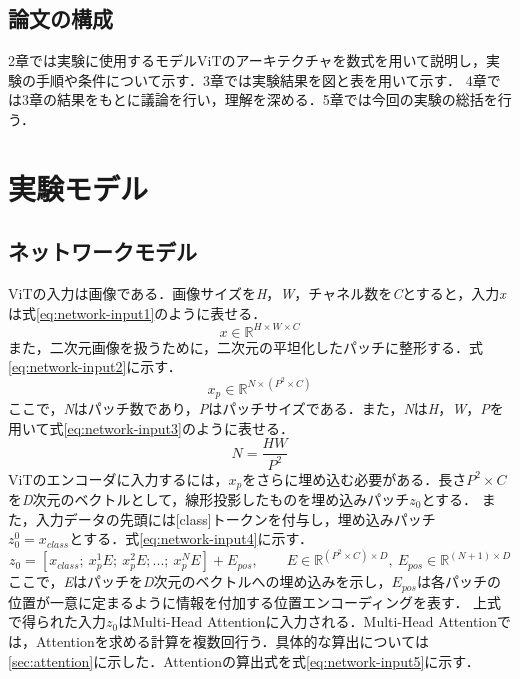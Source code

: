 \documentclass[a4paper, oneside, openany, dvipdfmx]{suribt}%
\newcommand{\eref}[1]{式\eqref{#1}}
\begin{document}
\section{論文の構成}
2章では実験に使用するモデルViTのアーキテクチャを数式を用いて説明し，実験の手順や条件について示す．3章では実験結果を図と表を用いて示す．
4章では3章の結果をもとに議論を行い，理解を深める．5章では今回の実験の総括を行う．

\chapter{実験モデル}

\section{ネットワークモデル}
ViTの入力は画像である．画像サイズを\textit{H}，\textit{W}，チャネル数を\textit{C}とすると，入力\textit{x}は\eref{eq:network-input1}のように表せる．
\begin{equation}
  x\in\mathbb{R}^{H\times W\times C}
  \label{eq:network-input1}
\end{equation}
また，二次元画像を扱うために，二次元の平坦化したパッチに整形する．\eref{eq:network-input2}に示す．
\begin{equation}
  x_{p}\in\mathbb{R}^{N\times(P^{2}\times C)}
  \label{eq:network-input2}
\end{equation}
ここで，\textit{N}はパッチ数であり，\textit{P}はパッチサイズである．また，\textit{N}は\textit{H}，\textit{W}，\textit{P}を用いて\eref{eq:network-input3}のように表せる．
\begin{equation}
  N=\frac{HW}{P^{2}}
  \label{eq:network-input3}
\end{equation}
ViTのエンコーダに入力するには，$x_{p}$をさらに埋め込む必要がある．長さ$P^{2}\times C$を\textit{D}次元のベクトルとして，線形投影したものを埋め込みパッチ$z_{0}$とする．
また，入力データの先頭には[class]トークンを付与し，埋め込みパッチ$z^{0}_{0}=x_{class}とする$．\eref{eq:network-input4}に示す．
\begin{equation}
  z_{0}=[x_{class};\ x^{1}_{p}E;\ x^{2}_{p}E;...;\ x^{N}_{p}E]+E_{pos},\qquad E\in\mathbb{R}^{(P^{2}\times C)\times D},\ E_{pos}\in\mathbb{R}^{(N+1)\times D}
  \label{eq:network-input4}
\end{equation}
ここで，\textit{E}はパッチを\textit{D}次元のベクトルへの埋め込みを示し，$E_{pos}$は各パッチの位置が一意に定まるように情報を付加する位置エンコーディングを表す．
上式で得られた入力$z_{0}$はMulti-Head Attentionに入力される．Multi-Head Attentionでは，Attentionを求める計算を複数回行う．具体的な算出については\ref{sec:attention}に示した．Attentionの算出式を\eref{eq:network-input5}に示す．
\end{document}
